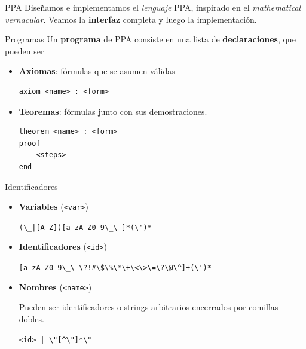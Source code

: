 \documentclass[xcolor={dvipsnames},spanish]{beamer}
\begin{document}

\begin{frame}[fragile]{PPA}
    Diseñamos e implementamos el \textit{lenguaje} PPA, inspirado en el
    \textit{mathematical vernacular}. Veamos la \textbf{interfaz} completa y luego la implementación.
    
\end{frame}

\begin{frame}[fragile]{Programas}
    Un \textbf{programa} de PPA consiste en una lista de \textbf{declaraciones},
    que pueden ser
    \begin{itemize}
        \item \textbf{Axiomas}: fórmulas que se asumen válidas
        \begin{lstlisting}[numbers=none]
axiom <name> : <form>
        \end{lstlisting}
        \item \textbf{Teoremas}: fórmulas junto con sus demostraciones.
\begin{lstlisting}[numbers=none]
theorem <name> : <form>
proof
    <steps>
end
\end{lstlisting}
    \end{itemize}
\end{frame}

\begin{frame}[fragile]{Identificadores}
    \begin{itemize}
        \item \textbf{Variables} (\lstinline{<var>})
        \begin{center}
            \verb/(\_|[A-Z])[a-zA-Z0-9\_\-]*(\')*/
        \end{center}
        \item \textbf{Identificadores} (\lstinline{<id>})
        \begin{center}
            \verb/[a-zA-Z0-9\_\-\?!#\$\%\*\+\<\>\=\?\@\^]+(\')*/
        \end{center}
        \item \textbf{Nombres} (\lstinline{<name>})
        
        Pueden ser identificadores o strings arbitrarios encerrados por comillas dobles.
        \begin{center}
            \verb/<id> | \"[^\"]*\"/
        \end{center}
    \end{itemize}
\end{frame}
\end{document}
